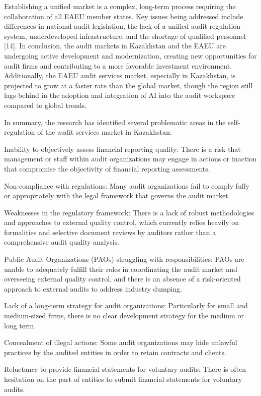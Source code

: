 \begin{multicols}{2}
Establishing a unified market is a complex, long-term process requiring
the collaboration of all EAEU member states. Key issues being addressed
include differences in national audit legislation, the lack of a unified
audit regulation system, underdeveloped infrastructure, and the shortage
of qualified personnel {[}14{]}. In conclusion, the audit markets in
Kazakhstan and the EAEU are undergoing active development and
modernization, creating new opportunities for audit firms and
contributing to a more favorable investment environment. Additionally,
the EAEU audit services market, especially in Kazakhstan, is projected
to grow at a faster rate than the global market, though the region still
lags behind in the adoption and integration of AI into the audit
workspace compared to global trends.

In summary, the research has identified several problematic areas in the
self-regulation of the audit services market in Kazakhstan:

Inability to objectively assess financial reporting quality: There is a
risk that management or staff within audit organizations may engage in
actions or inaction that compromise the objectivity of financial
reporting assessments.

Non-compliance with regulations: Many audit organizations fail to comply
fully or appropriately with the legal framework that governs the audit
market.

Weaknesses in the regulatory framework: There is a lack of robust
methodologies and approaches to external quality control, which
currently relies heavily on formalities and selective document reviews
by auditors rather than a comprehensive audit quality analysis.

Public Audit Organizations (PAOs) struggling with responsibilities: PAOs
are unable to adequately fulfill their roles in coordinating the audit
market and overseeing external quality control, and there is an absence
of a risk-oriented approach to external audits to address industry
dumping.

Lack of a long-term strategy for audit organizations: Particularly for
small and medium-sized firms, there is no clear development strategy for
the medium or long term.

Concealment of illegal actions: Some audit organizations may hide
unlawful practices by the audited entities in order to retain contracts
and clients.

Reluctance to provide financial statements for voluntary audits: There
is often hesitation on the part of entities to submit financial
statements for voluntary audits.


\end{multicols}
